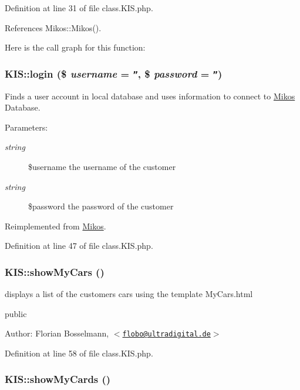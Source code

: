 Definition at line 31 of file class.KIS.php.

References Mikos::Mikos().

Here is the call graph for this function:\hypertarget{class_k_i_s_46fbc5ab041178822e533227438a32ad}{
\subsubsection{\setlength{\rightskip}{0pt plus 5cm}KIS::login (\$ {\em username} = {\tt ''}, \$ {\em password} = {\tt ''})}}
\label{class_k_i_s_46fbc5ab041178822e533227438a32ad}


Finds a user account in local database and uses information to connect to \hyperlink{class_mikos}{Mikos} Database.

\begin{Desc}
\item[Parameters:]
\begin{description}
\item[{\em string}]\$username the username of the customer \item[{\em string}]\$password the password of the customer \end{description}
\end{Desc}


Reimplemented from \hyperlink{class_mikos_539ff1a8891af79abcc16ed355982bef}{Mikos}.

Definition at line 47 of file class.KIS.php.\hypertarget{class_k_i_s_825b8a492e9a28367225290f7aa3bcdc}{
\subsubsection{\setlength{\rightskip}{0pt plus 5cm}KIS::showMyCars ()}}
\label{class_k_i_s_825b8a492e9a28367225290f7aa3bcdc}


displays a list of the customers cars using the template MyCars.html

public \begin{Desc}
\item[Author:]Florian Bosselmann, $<$\href{mailto:flobo@ultradigital.de}{\tt flobo@ultradigital.de}$>$ \end{Desc}


Definition at line 58 of file class.KIS.php.\hypertarget{class_k_i_s_1240f8ba6583cec08f13f1922428df24}{
\subsubsection{\setlength{\rightskip}{0pt plus 5cm}KIS::showMyCards ()}}
\label{class_k_i_s_1240f8ba6583cec08f13f1922428df24}



